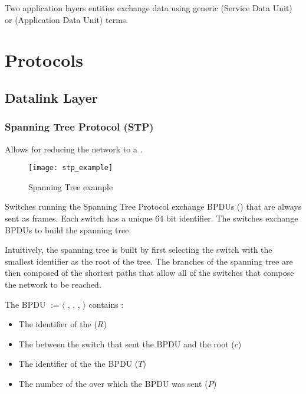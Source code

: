 Two application layers entities exchange data using generic  (Service Data Unit) or  (Application Data Unit) terms.

\chapter{Protocols}

\section{Datalink Layer}

\subsection[STP]{Spanning Tree Protocol (STP)}

Allows for reducing the network to a .

\begin{minipage}{0.38\textwidth}
	\begin{figure}[H]
		\centering
		\texttt{[image: stp\_example]}
		\caption{Spanning Tree example}
	\end{figure}
\end{minipage}
\begin{minipage}{0.6\textwidth}
	Switches running the Spanning Tree Protocol exchange BPDUs () that are always sent as frames. Each switch has a unique 64 bit identifier. The switches exchange BPDUs to build the spanning tree.
	
	Intuitively, the spanning tree is built by first selecting the switch with the smallest identifier as the root of the tree. The branches of the spanning tree are then composed of the shortest paths that allow all of the switches that compose the network to be reached.
\end{minipage}

The BPDU $:= \langle$ , , ,  $\rangle$ contains :
\begin{itemize}
\item The identifier of the  ($R$)
\item The  between the switch that sent the BPDU and the root ($c$)
\item The identifier of the  the BPDU ($T$)
\item The number of the  over which the BPDU was sent ($P$)
\end{itemize}

